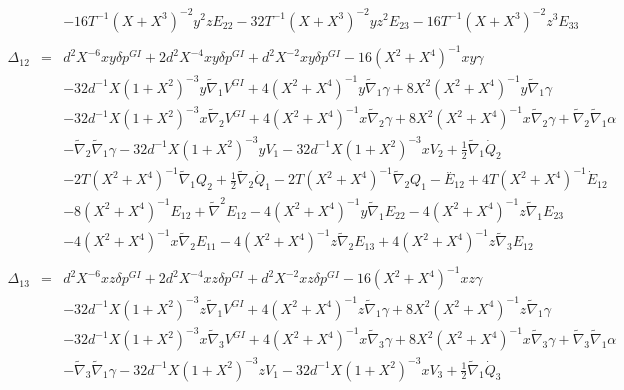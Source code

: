 \documentclass[10pt,letterpaper]{article}
\numberwithin{equation}{section}
\begin{document}
\begin{eqnarray}
&& - 16 T^{-1} (X + X^3)^{-2} y^2 z E_{22} - 32 T^{-1} (X + X^3)^{-2} y z^2 E_{23} - 16 T^{-1} (X + X^3)^{-2} z^3 E_{33}
\\  \nonumber\\ 
\Delta_{12}&=& d^2 X^{-6} x y \delta p^{GI}{} + 2 d^2 X^{-4} x y \delta p^{GI}{} + d^2 X^{-2} x y \delta p^{GI}{} - 16 (X^2 + X^4)^{-1} x y \gamma \nonumber \\ 
&& - 32 d^{-1} X (1 + X^2)^{-3} y \tilde{\nabla}_{1}V^{GI}{} + 4 (X^2 + X^4)^{-1} y \tilde{\nabla}_{1}\gamma + 8 X^2 (X^2 + X^4)^{-1} y \tilde{\nabla}_{1}\gamma \nonumber \\ 
&& - 32 d^{-1} X (1 + X^2)^{-3} x \tilde{\nabla}_{2}V^{GI}{} + 4 (X^2 + X^4)^{-1} x \tilde{\nabla}_{2}\gamma + 8 X^2 (X^2 + X^4)^{-1} x \tilde{\nabla}_{2}\gamma + \tilde{\nabla}_{2}\tilde{\nabla}_{1}\alpha \nonumber \\ 
&& -  \tilde{\nabla}_{2}\tilde{\nabla}_{1}\gamma -32 d^{-1} X (1 + X^2)^{-3} y V_{1} - 32 d^{-1} X (1 + X^2)^{-3} x V_{2} + \tfrac{1}{2} \tilde{\nabla}_{1}\dot{Q}_{2} \nonumber \\ 
&& - 2 T (X^2 + X^4)^{-1} \tilde{\nabla}_{1}Q_{2} + \tfrac{1}{2} \tilde{\nabla}_{2}\dot{Q}_{1} - 2 T (X^2 + X^4)^{-1} \tilde{\nabla}_{2}Q_{1}- \overset{..}{E}_{12} + 4 T (X^2 + X^4)^{-1} \dot{E}_{12} \nonumber \\ 
&& - 8 (X^2 + X^4)^{-1} E_{12} + \tilde{\nabla}^{2}E_{12} - 4 (X^2 + X^4)^{-1} y \tilde{\nabla}_{1}E_{22} - 4 (X^2 + X^4)^{-1} z \tilde{\nabla}_{1}E_{23} \nonumber \\ 
&& - 4 (X^2 + X^4)^{-1} x \tilde{\nabla}_{2}E_{11} - 4 (X^2 + X^4)^{-1} z \tilde{\nabla}_{2}E_{13} + 4 (X^2 + X^4)^{-1} z \tilde{\nabla}_{3}E_{12}
\\  \nonumber\\ 
\Delta_{13}&=& d^2 X^{-6} x z \delta p^{GI}{} + 2 d^2 X^{-4} x z \delta p^{GI}{} + d^2 X^{-2} x z \delta p^{GI}{} - 16 (X^2 + X^4)^{-1} x z \gamma \nonumber \\ 
&& - 32 d^{-1} X (1 + X^2)^{-3} z \tilde{\nabla}_{1}V^{GI}{} + 4 (X^2 + X^4)^{-1} z \tilde{\nabla}_{1}\gamma + 8 X^2 (X^2 + X^4)^{-1} z \tilde{\nabla}_{1}\gamma \nonumber \\ 
&& - 32 d^{-1} X (1 + X^2)^{-3} x \tilde{\nabla}_{3}V^{GI}{} + 4 (X^2 + X^4)^{-1} x \tilde{\nabla}_{3}\gamma + 8 X^2 (X^2 + X^4)^{-1} x \tilde{\nabla}_{3}\gamma + \tilde{\nabla}_{3}\tilde{\nabla}_{1}\alpha \nonumber \\ 
&& -  \tilde{\nabla}_{3}\tilde{\nabla}_{1}\gamma -32 d^{-1} X (1 + X^2)^{-3} z V_{1} - 32 d^{-1} X (1 + X^2)^{-3} x V_{3} + \tfrac{1}{2} \tilde{\nabla}_{1}\dot{Q}_{3} \nonumber \\ 

\end{eqnarray}
\end{document}
